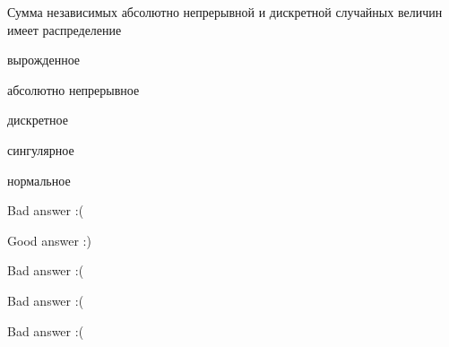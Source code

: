 
\begin{question}
Сумма независимых абсолютно непрерывной и дискретной случайных величин
имеет распределение
\begin{answerlist}
  \item вырожденное
  \item абсолютно непрерывное
  \item дискретное
  \item сингулярное
  \item нормальное
\end{answerlist}
\end{question}

\begin{solution}
\begin{answerlist}
  \item Bad answer :(
  \item Good answer :)
  \item Bad answer :(
  \item Bad answer :(
  \item Bad answer :(
\end{answerlist}
\end{solution}

